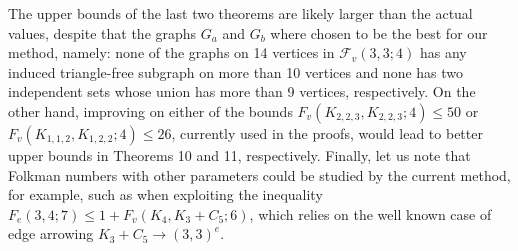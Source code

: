 \medskip
The upper bounds of the last two theorems are
likely larger than the actual values, despite that
the graphs $G_a$ and $G_b$ where chosen
to be the best for our method, namely: none of the graphs on
14 vertices in $\mathcal{F}_v(3,3;4)$ has any induced triangle-free
subgraph on more than 10 vertices and none has two independent
sets whose union has more than 9 vertices, respectively.
On the other hand, improving on either of the bounds
$F_v(K_{2,2,3},K_{2,2,3};4) \le 50$ or
$F_v(K_{1,1,2},K_{1,2,2};4) \le 26$, currently
used in the proofs, would lead to better upper bounds
in Theorems 10 and 11, respectively. Finally, let us
note that Folkman numbers with other parameters
could be studied by the current method, for example,
such as when exploiting the inequality
$F_e(3,4;7) \leq 1+F_v(K_4,K_3+C_5;6)$, which relies on
the well known case of edge arrowing $K_3+C_5 \rightarrow (3,3)^e$.

\bigskip
